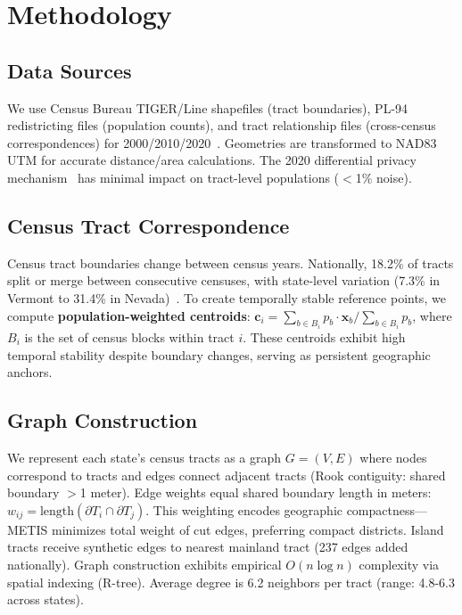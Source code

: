 \section{Methodology}
\label{sec:methodology}

\subsection{Data Sources}

We use Census Bureau TIGER/Line shapefiles (tract boundaries), PL-94 redistricting files (population counts), and tract relationship files (cross-census correspondences) for 2000/2010/2020~\cite{census2020tiger, census2020pl94, census2020relationships}. Geometries are transformed to NAD83 UTM for accurate distance/area calculations. The 2020 differential privacy mechanism~\cite{abowd2022} has minimal impact on tract-level populations ($<$1\% noise).

\subsection{Census Tract Correspondence}

Census tract boundaries change between census years. Nationally, 18.2\% of tracts split or merge between consecutive censuses, with state-level variation (7.3\% in Vermont to 31.4\% in Nevada)~\cite{schroeder2007}. To create temporally stable reference points, we compute \textbf{population-weighted centroids}: $\mathbf{c}_i = \sum_{b \in B_i} p_b \cdot \mathbf{x}_b / \sum_{b \in B_i} p_b$, where $B_i$ is the set of census blocks within tract $i$. These centroids exhibit high temporal stability despite boundary changes, serving as persistent geographic anchors.

\subsection{Graph Construction}

We represent each state's census tracts as a graph $G = (V, E)$ where nodes correspond to tracts and edges connect adjacent tracts (Rook contiguity: shared boundary $>$1 meter). Edge weights equal shared boundary length in meters: $w_{ij} = \text{length}(\partial T_i \cap \partial T_j)$. This weighting encodes geographic compactness—METIS minimizes total weight of cut edges, preferring compact districts. Island tracts receive synthetic edges to nearest mainland tract (237 edges added nationally). Graph construction exhibits empirical $O(n \log n)$ complexity via spatial indexing (R-tree). Average degree is 6.2 neighbors per tract (range: 4.8-6.3 across states).

